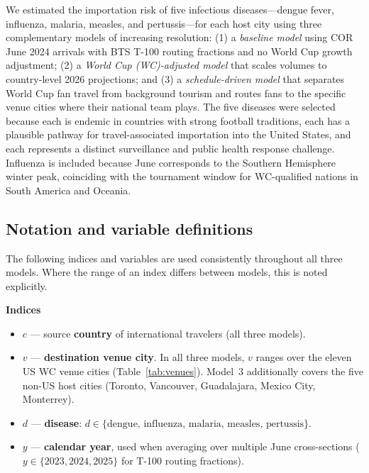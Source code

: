 \documentclass[12pt]{article}
\begin{document}
We estimated the importation risk of five infectious diseases---dengue
fever, influenza, malaria, measles, and pertussis---for each host city
using three complementary models of increasing resolution: (1) a
\emph{baseline model} using COR June 2024 arrivals with BTS T-100
routing fractions and no World Cup growth adjustment; (2) a \emph{World
Cup (WC)-adjusted model} that scales volumes to country-level 2026
projections; and (3) a \emph{schedule-driven model} that separates
World Cup fan travel from background tourism and routes fans to the
specific venue cities where their national team plays.
The five diseases were selected because each is endemic in countries
with strong football traditions, each has a plausible pathway for
travel-associated importation into the United States, and each
represents a distinct surveillance and public health response
challenge. Influenza is included because June corresponds to the
Southern Hemisphere winter peak, coinciding with the tournament window
for WC-qualified nations in South America and Oceania.

\subsection*{Notation and variable definitions}

The following indices and variables are used consistently throughout
all three models. Where the range of an index differs between models,
this is noted explicitly.

\vspace{0.5em}
\noindent\textbf{Indices}
\begin{itemize}
  \item $c$ --- source \textbf{country} of international travelers
    (all three models).
  \item $v$ --- \textbf{destination venue city}. In all three models,
    $v$ ranges over the eleven US WC venue cities
    (Table~\ref{tab:venues}). Model~3 additionally covers the five
    non-US host cities (Toronto, Vancouver, Guadalajara, Mexico City,
    Monterrey).
  \item $d$ --- \textbf{disease}: $d \in \{\text{dengue},\,
    \text{influenza},\, \text{malaria},\, \text{measles},\,
    \text{pertussis}\}$.
  \item $y$ --- \textbf{calendar year}, used when averaging over
    multiple June cross-sections ($y \in \{2023, 2024, 2025\}$ for
    T-100 routing fractions).
\end{itemize}
\end{document}
